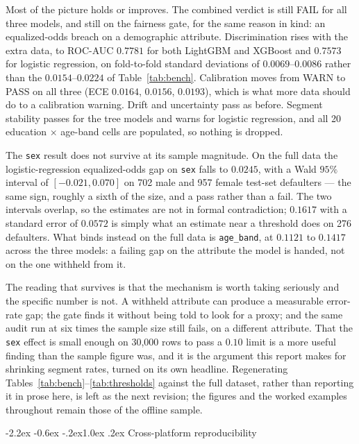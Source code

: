 \documentclass[10pt,a4paper]{article}
\makeatletter
\renewcommand\section{\@startsection{section}{1}{\z@}%
  {-2.2ex \@plus -0.6ex \@minus -.2ex}{1.0ex \@plus .2ex}%
  {\normalfont\large\bfseries}}
\newcommand{\code}[1]{\texttt{\small #1}}
\makeatother
\begin{document}
Most of the picture holds or improves. The combined verdict is still FAIL for all
three models, and still on the fairness gate, for the same reason in kind: an
equalized-odds breach on a demographic attribute. Discrimination rises with the
extra data, to ROC-AUC $0.7781$ for both LightGBM and XGBoost and $0.7573$ for
logistic regression, on fold-to-fold standard deviations of $0.0069$--$0.0086$
rather than the $0.0154$--$0.0224$ of Table~\ref{tab:bench}. Calibration moves from
WARN to PASS on all three (ECE $0.0164$, $0.0156$, $0.0193$), which is what more
data should do to a calibration warning. Drift and uncertainty pass as before.
Segment stability passes for the tree models and warns for logistic regression, and
all 20 education $\times$ age-band cells are populated, so nothing is dropped.

The \code{sex} result does not survive at its sample magnitude. On the full data
the logistic-regression equalized-odds gap on \code{sex} falls to $0.0245$, with a
Wald $95\%$ interval of $[-0.021, 0.070]$ on 702 male and 957 female test-set
defaulters --- the same sign, roughly a sixth of the size, and a pass rather than a
fail. The two intervals overlap, so the estimates are not in formal contradiction;
$0.1617$ with a standard error of $0.0572$ is simply what an estimate near a
threshold does on 276 defaulters. What binds instead on the full data is
\code{age\_band}, at $0.1121$ to $0.1417$ across the three models: a failing gap on
the attribute the model is handed, not on the one withheld from it.

The reading that survives is that the mechanism is worth taking seriously and the
specific number is not. A withheld attribute can produce a measurable error-rate
gap; the gate finds it without being told to look for a proxy; and the same audit
run at six times the sample size still fails, on a different attribute. That the
\code{sex} effect is small enough on 30{,}000 rows to pass a $0.10$ limit is a more
useful finding than the sample figure was, and it is the argument this report makes
for shrinking segment rates, turned on its own headline. Regenerating
Tables~\ref{tab:bench}--\ref{tab:thresholds} against the full dataset, rather than
reporting it in prose here, is left as the next revision; the figures and the
worked examples throughout remain those of the offline sample.

\section{Cross-platform reproducibility}
\label{sec:repro}
\end{document}
